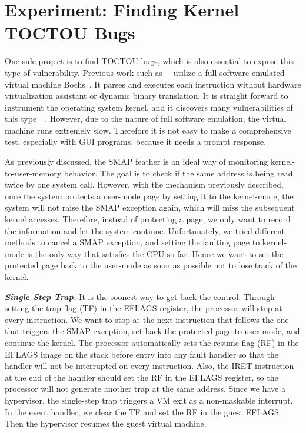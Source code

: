 \section{Experiment: Finding Kernel TOCTOU Bugs}
\label{sec:experiment}
One side-project is to find TOCTOU bugs, which is also essential to expose this type of vulnerability.  Previous work such as~\cite{jurczyk2013identifying}~\cite{bochspwnreloaded} utilize a full software emulated virtual machine Bochs~\cite{lawton2003bochs}. It parses and executes each instruction without hardware virtualization assistant or dynamic binary translation.  It is straight forward to instrument the operating system kernel, and it discovers many vulnerabilities of this type~\cite{jurczyk2013identifying}~\cite{bochspwnreloaded}. However, due to the nature of full software emulation, the virtual machine runs extremely slow. Therefore it is not easy to make a comprehensive test, especially with GUI programs, because it needs a prompt response.

As previously discussed, the SMAP feather is an ideal way of monitoring kernel-to-user-memory behavior. The goal is to check if the same address is being read twice by one system call. However, with the mechanism previously described, once the system protects a user-mode page by setting it to the kernel-mode, the system will not raise the SMAP exception again, which will miss the subsequent kernel accesses. Therefore, instead of protecting a page, we only want to record the information and let the system continue. Unfortunately, we tried different methods to cancel a SMAP exception, and setting the faulting page to kernel-mode is the only way that satisfies the CPU so far. Hence we want to set the protected page back to the user-mode as soon as possible not to lose track of the kernel. 

\textbf{\textit{Single Step Trap.}} It is the soonest way to get back the control. Through setting the trap flag (TF) in the EFLAGS register, the processor will stop at every instruction. We want to stop at the next instruction that follows the one that triggers the SMAP exception, set back the protected page to user-mode, and continue the kernel. The processor automatically sets the resume flag (RF) in the EFLAGS image on the stack before entry into any fault handler so that the handler will not be interrupted on every instruction. Also, the IRET instruction at the end of the handler should set the RF in the EFLAGS register, so the processor will not generate another trap at the same address. Since we have a hypervisor, the single-step trap triggers a VM exit as a non-maskable interrupt. In the event handler, we clear the TF and set the RF in the guest EFLAGS. Then the hypervisor resumes the guest virtual machine.

